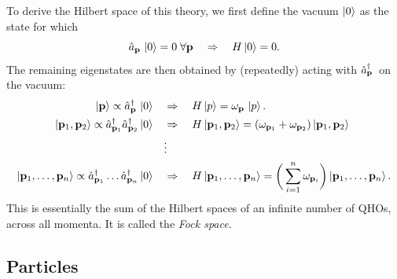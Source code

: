 To derive the Hilbert space of this theory, we first define the vacuum $\ket{0}$ as the state for which 
\begin{equation}
    \label{eq:01_qft_quantization_hamiltonian_vacuum}
    \hat a_{\mathbf{p}}\, \ket{0} = 0\; \forall \mathbf{p} \quad \Rightarrow \quad H\ket{0} = 0.
\end{equation}
The remaining eigenstates are then obtained by (repeatedly) acting with $\hat a^\dagger_{\mathbf{p}}\,$ on the vacuum:
\begin{equation}
    \label{eq:01_qft_quantization_hamiltonian_states}
    \begin{split}
        \ket{\mathbf{p}} \propto \hat a^\dagger_{\mathbf{p}}\,\ket{0} \quad &\Rightarrow \quad H\ket{p} = \omega_{\mathbf{p}}\,\ket{p}. \\
        \ket{\mathbf{p}_1, \mathbf{p}_2} \propto \hat a^\dagger_{\mathbf{p}_1}\hat a^\dagger_{\mathbf{p}_2}\ket{0} \quad &\Rightarrow \quad H\ket{\mathbf{p}_1, \mathbf{p}_2} = (\omega_{\mathbf{p}_1} + \omega_{\mathbf{p}_2})\ket{\mathbf{p}_1, \mathbf{p}_2} \\
        &\vdots \\
        \ket{\mathbf{p}_1, \ldots, \mathbf{p}_n} \propto \hat a^\dagger_{\mathbf{p}_1} \ldots\hat a^\dagger_{\mathbf{p}_n}\ket{0} \quad &\Rightarrow \quad H\ket{\mathbf{p}_1, \ldots, \mathbf{p}_n} = \bigg(\sum_{i=1}^n \omega_{\mathbf{p}_i}\bigg) \ket{\mathbf{p}_1,  \ldots, \mathbf{p}_n}.
    \end{split}
\end{equation}
This is essentially the sum of the Hilbert spaces of an infinite number of QHOs, across all momenta.
It is called the \textit{Fock space}.

\subsection{Particles}

